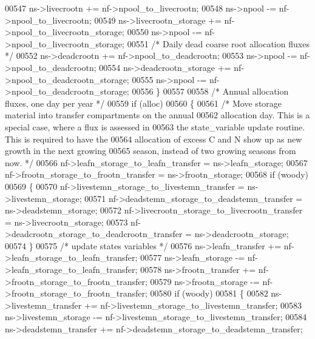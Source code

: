 \begin{DoxyCode}
{00547         ns->livecrootn         += nf->npool\_to\_livecrootn;
00548         ns->npool              -= nf->npool\_to\_livecrootn;
00549         ns->livecrootn\_storage += nf->npool\_to\_livecrootn\_storage;
00550         ns->npool              -= nf->npool\_to\_livecrootn\_storage;
00551         \textcolor{comment}{/* Daily dead coarse root allocation fluxes */}
00552         ns->deadcrootn         += nf->npool\_to\_deadcrootn;
00553         ns->npool              -= nf->npool\_to\_deadcrootn;
00554         ns->deadcrootn\_storage += nf->npool\_to\_deadcrootn\_storage;
00555         ns->npool              -= nf->npool\_to\_deadcrootn\_storage;
00556     \}
00557     
00558     \textcolor{comment}{/* Annual allocation fluxes, one day per year */}
00559     \textcolor{keywordflow}{if} (alloc)
00560     \{
00561         \textcolor{comment}{/* Move storage material into transfer compartments on the annual}
00562 \textcolor{comment}{        allocation day. This is a special case, where a flux is assessed in}
00563 \textcolor{comment}{        the state\_variable update routine.  This is required to have the}
00564 \textcolor{comment}{        allocation of excess C and N show up as new growth in the next growing}
00565 \textcolor{comment}{        season, instead of two growing seasons from now. */}
00566         nf->leafn\_storage\_to\_leafn\_transfer = ns->leafn\_storage;
00567         nf->frootn\_storage\_to\_frootn\_transfer = ns->frootn\_storage;
00568         \textcolor{keywordflow}{if} (woody)
00569         \{
00570             nf->livestemn\_storage\_to\_livestemn\_transfer = ns->livestemn\_storage;
00571             nf->deadstemn\_storage\_to\_deadstemn\_transfer = ns->deadstemn\_storage;
00572             nf->livecrootn\_storage\_to\_livecrootn\_transfer = ns->livecrootn\_storage;
00573             nf->deadcrootn\_storage\_to\_deadcrootn\_transfer = ns->deadcrootn\_storage;
00574         \}
00575         \textcolor{comment}{/* update states variables */}
00576         ns->leafn\_transfer    += nf->leafn\_storage\_to\_leafn\_transfer;
00577         ns->leafn\_storage     -= nf->leafn\_storage\_to\_leafn\_transfer;
00578         ns->frootn\_transfer   += nf->frootn\_storage\_to\_frootn\_transfer;
00579         ns->frootn\_storage    -= nf->frootn\_storage\_to\_frootn\_transfer;
00580         \textcolor{keywordflow}{if} (woody)
00581         \{
00582             ns->livestemn\_transfer  += nf->livestemn\_storage\_to\_livestemn\_transfer;
00583             ns->livestemn\_storage   -= nf->livestemn\_storage\_to\_livestemn\_transfer;
00584             ns->deadstemn\_transfer  += nf->deadstemn\_storage\_to\_deadstemn\_transfer;
}
\end{DoxyCode}
